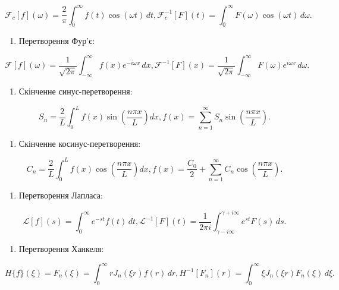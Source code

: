 \documentclass[
  ukrainian,
]{article}
\providecommand{\tightlist}{%
  \setlength{\itemsep}{0pt}\setlength{\parskip}{0pt}}
\begin{document}
\[
\mathcal{F}_c[f](\omega) = \frac{2}{\pi}\int_0^\infty f(t)\cos(\omega t)\,dt,
\mathcal{F}_c^{-1}[F](t) = \int_0^\infty F(\omega)\cos(\omega t)\,d\omega.
\]

\begin{enumerate}
\def\labelenumi{\arabic{enumi}.}
\setcounter{enumi}{2}
\tightlist
\item
  Перетворення Фур'є:
\end{enumerate}

\[
\mathcal{F}[f](\omega) = \frac{1}{\sqrt{2\pi}}\int_{-\infty}^{\infty} f(x)e^{-i\omega x}\,dx,
\mathcal{F}^{-1}[F](x) = \frac{1}{\sqrt{2\pi}}\int_{-\infty}^{\infty} F(\omega)e^{i\omega x}\,d\omega.
\]

\begin{enumerate}
\def\labelenumi{\arabic{enumi}.}
\setcounter{enumi}{3}
\tightlist
\item
  Скінченне синус-перетворення:
\end{enumerate}

\[
S_n = \frac{2}{L}\int_0^L f(x)\sin\!\left(\frac{n\pi x}{L}\right) dx,
f(x) = \sum_{n=1}^{\infty} S_n \sin\!\left(\frac{n\pi x}{L}\right).
\]

\begin{enumerate}
\def\labelenumi{\arabic{enumi}.}
\setcounter{enumi}{4}
\tightlist
\item
  Скінченне косинус-перетворення:
\end{enumerate}

\[
C_n = \frac{2}{L}\int_0^L f(x)\cos\!\left(\frac{n\pi x}{L}\right) dx,
f(x) = \frac{C_0}{2} + \sum_{n=1}^{\infty} C_n \cos\!\left(\frac{n\pi x}{L}\right).
\]

\begin{enumerate}
\def\labelenumi{\arabic{enumi}.}
\setcounter{enumi}{5}
\tightlist
\item
  Перетворення Лапласа:
\end{enumerate}

\[
\mathcal{L}[f](s) = \int_0^\infty e^{-st}f(t)\,dt,
\mathcal{L}^{-1}[F](t) = \frac{1}{2\pi i}\int_{\gamma-i\infty}^{\gamma+i\infty} e^{st}F(s)\,ds.
\]

\begin{enumerate}
\def\labelenumi{\arabic{enumi}.}
\setcounter{enumi}{6}
\tightlist
\item
  Перетворення Ханкеля:
\end{enumerate}

\[
H\{f\}(\xi) = F_n(\xi) = \int_0^\infty r J_n(\xi r) f(r)\,dr,
H^{-1}[F_n](r) = \int_0^\infty \xi J_n(\xi r) F_n(\xi)\,d\xi.
\]
\end{document}
